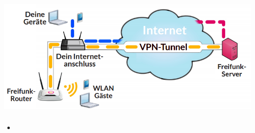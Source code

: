 \begin{frame}
\frametitle{}
\includegraphics[scale=0.3]{images/personal_setup.png}
\end{frame}



\begin{frame}
\frametitle{}
\begin{itemize}
\item 
\end{itemize}
\end{frame}
